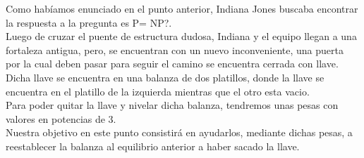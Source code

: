 Como hab\'iamos enunciado en el punto anterior, Indiana Jones buscaba encontrar la respuesta a la pregunta es P= NP?.\\

Luego de cruzar el puente de estructura dudosa, Indiana y el equipo llegan a una fortaleza antigua, pero, se encuentran con un nuevo inconveniente, una puerta por la cual deben pasar para seguir el camino se encuentra cerrada con llave.\\

Dicha llave se encuentra en una balanza de dos platillos, donde la llave se encuentra en el platillo de la izquierda mientras que el otro esta vacio.\\

Para poder quitar la llave y nivelar dicha balanza, tendremos unas pesas con valores en potencias de 3.\\

Nuestra objetivo en este punto consistir\'a en ayudarlos, mediante dichas pesas, a reestablecer la balanza al equilibrio anterior a haber sacado la llave.\\





